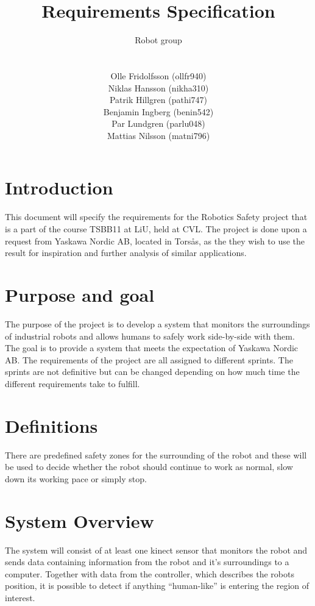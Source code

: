 \documentclass[10pt,a4paper]{article}
\title{Requirements Specification}
\author{\begin{large}{Robot group}\end{large}\\\\
Olle Fridolfsson (ollfr940) \\  Niklas Hansson (nikha310) \\ Patrik Hillgren (pathi747) \\ Benjamin Ingberg (benin542)\\ Par Lundgren (parlu048) \\ Mattias Nilsson (matni796)}
\begin{document}
\maketitle
\newpage
\tableofcontents
\newpage
\noindent %
\section{Introduction}
This document will specify the requirements for the Robotics Safety project that is a part of the course TSBB11 at LiU, held at CVL. The project is done upon a request from Yaskawa Nordic AB, located in Torsås, as the they wish to use the result for inspiration and further analysis of similar applications.
\section{Purpose and goal}
The purpose of the project is to develop a system that monitors the surroundings of industrial robots and allows humans to safely work side-by-side with them. 
The goal is to provide a system that meets the expectation of Yaskawa Nordic AB.
The requirements of the project are all assigned to different sprints. The sprints are not definitive but can be changed depending on how much time the different requirements take to fulfill. 

\section{Definitions}
There are predefined safety zones for the surrounding of the robot and these will be used to decide whether the robot should continue to work as normal, slow down its working pace or simply stop.

\section{System Overview}
The system will consist of at least one kinect sensor that monitors the robot and sends data containing information from the robot and it’s surroundings to a computer. Together with data from the controller, which describes the robots position, it is possible to detect if anything “human-like” is entering the region of interest.
\end{document}
